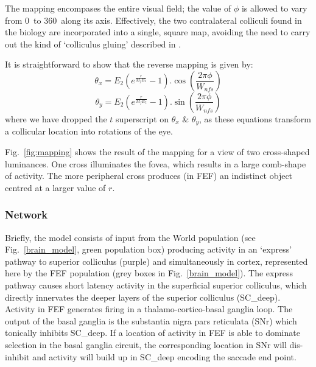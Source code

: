 \documentclass{frontiersSCNS}
\begin{document}
The mapping encompases the entire visual field; the value of $\phi$ is
allowed to vary from 0\dg~to 360\dg~along its axis.  Effectively, the
two contralateral colliculi found in the biology are incorporated into
a single, square map, avoiding the need to carry out the kind of
`colliculus gluing' described in \cite{tabareau_geometry_2007}.

It is straightforward to show that the reverse mapping is given by:
\begin{equation}
   \theta_x = E_2 \left(e^{\frac{r}{M_f E_2}} - 1\right).\cos\left(\frac{2 \pi \phi}{W_{nfs}}\right)
\end{equation}
\begin{equation}
   \theta_y = E_2 \left(e^{\frac{r}{M_f E_2}} - 1\right).\sin\left(\frac{2 \pi \phi}{W_{nfs}}\right)
\end{equation}
where we have dropped the $t$ superscript on $\theta_x$ \& $\theta_y$,
as these equations transform a collicular location into rotations of
the eye.

Fig.~\ref{fig:mapping} shows the result of the mapping for a view of
two cross-shaped luminances. One cross illuminates the fovea, which
results in a large comb-shape of activity. The more peripheral cross
produces (in FEF) an indistinct object centred at a larger value of
$r$.

\subsubsection{Network}

Briefly, the model consists of input from the World population (see
Fig.~\ref{brain_model}, green population box) producing activity in an
`express' pathway to superior colliculus (purple) and simultaneously
in cortex, represented here by the FEF population (grey boxes in
Fig.~\ref{brain_model}). The express pathway causes short latency
activity in the superficial superior colliculus, which directly
innervates the deeper layers of the superior colliculus
(SC\_deep). Activity in FEF generates firing in a
thalamo-cortico-basal ganglia loop. The output of the basal ganglia is
the substantia nigra pars reticulata (SNr) which tonically inhibits
SC\_deep. If a location of activity in FEF is able to dominate
selection in the basal ganglia circuit, the corresponding location in
SNr will dis-inhibit and activity will build up in SC\_deep encoding
the saccade end point.
\end{document}
